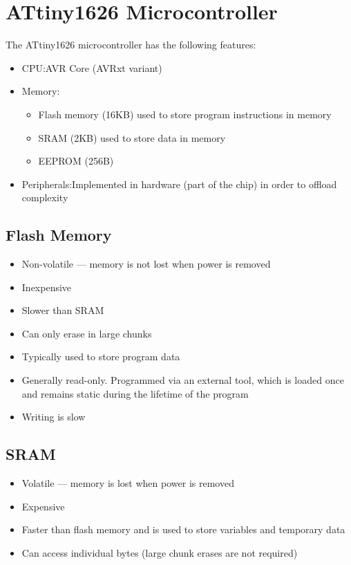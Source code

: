 \documentclass[a4paper]{report}
\begin{document}
\section{ATtiny1626 Microcontroller}
The ATtiny1626 microcontroller has the following features:
\begin{itemize}
    \item CPU:\@ AVR Core (AVRxt variant)
    \item Memory:\@
          \begin{itemize}
              \item Flash memory (16KB) used to store program instructions in memory
              \item SRAM (2KB) used to store data in memory
              \item EEPROM (256B)
          \end{itemize}
    \item Peripherals:\@ Implemented in hardware (part of the chip) in order to offload complexity
\end{itemize}
\subsection{Flash Memory}
\begin{itemize}
    \item Non-volatile --- memory is not lost when power is removed
    \item Inexpensive
    \item Slower than SRAM
    \item Can only erase in large chunks
    \item Typically used to store program data
    \item Generally read-only. Programmed via an external tool, which is loaded once and remains static during the lifetime of the program
    \item Writing is slow
\end{itemize}
\subsection{SRAM}
\begin{itemize}
    \item Volatile --- memory is lost when power is removed
    \item Expensive
    \item Faster than flash memory and is used to store variables and temporary data
    \item Can access individual bytes (large chunk erases are not required)
\end{itemize}
\end{document}
